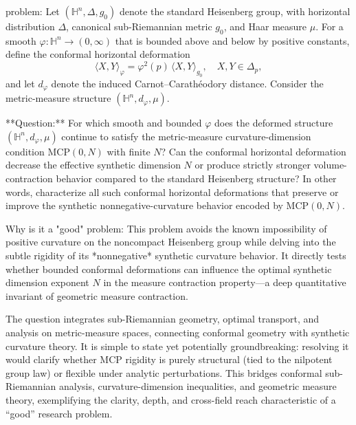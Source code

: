 problem:  
Let \((\mathbb{H}^n,\Delta,g_0)\) denote the standard Heisenberg group, with horizontal distribution \(\Delta\), canonical sub-Riemannian metric \(g_0\), and Haar measure \(\mu\).  
For a smooth \(\varphi:\mathbb{H}^n\to(0,\infty)\) that is bounded above and below by positive constants, define the conformal horizontal deformation  
\[
\langle X,Y\rangle_\varphi = \varphi^2(p)\,\langle X,Y\rangle_{g_0},\quad X,Y\in \Delta_p,
\]
and let \(d_\varphi\) denote the induced Carnot–Carathéodory distance. Consider the metric-measure structure \((\mathbb{H}^n,d_\varphi,\mu)\).  

**Question:**  
For which smooth and bounded \(\varphi\) does the deformed structure \((\mathbb{H}^n,d_\varphi,\mu)\) continue to satisfy the metric-measure curvature-dimension condition \(\mathrm{MCP}(0,N)\) with finite \(N\)?  
Can the conformal horizontal deformation decrease the effective synthetic dimension \(N\) or produce strictly stronger volume-contraction behavior compared to the standard Heisenberg structure?  
In other words, characterize all such conformal horizontal deformations that preserve or improve the synthetic nonnegative-curvature behavior encoded by \(\mathrm{MCP}(0,N)\).

Why is it a "good" problem:  
This problem avoids the known impossibility of positive curvature on the noncompact Heisenberg group while delving into the subtle rigidity of its *nonnegative* synthetic curvature behavior. It directly tests whether bounded conformal deformations can influence the optimal synthetic dimension exponent \(N\) in the measure contraction property—a deep quantitative invariant of geometric measure contraction.  

The question integrates sub-Riemannian geometry, optimal transport, and analysis on metric-measure spaces, connecting conformal geometry with synthetic curvature theory. It is simple to state yet potentially groundbreaking: resolving it would clarify whether MCP rigidity is purely structural (tied to the nilpotent group law) or flexible under analytic perturbations. This bridges conformal sub-Riemannian analysis, curvature-dimension inequalities, and geometric measure theory, exemplifying the clarity, depth, and cross-field reach characteristic of a “good” research problem.